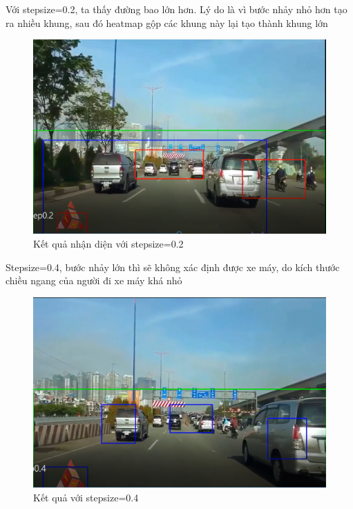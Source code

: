 \documentclass[10pt,conference,a4paper]{IEEEtran}
\begin{document}
Với stepsize=0.2, ta thấy đường bao lớn hơn. Lý do là vì bước nhảy nhỏ hơn tạo ra nhiều khung, sau đó heatmap gộp các khung này lại tạo thành khung lớn
\begin{figure}[h]
	\centering
	\includegraphics[width=1\linewidth, height=0.2\textheight]{ketqua3}
	\caption{Kết quả nhận diện với stepsize=0.2}
	\label{fig:ketqua3}
\end{figure}

Stepsize=0.4, bước nhảy lớn thì sẽ không xác định được xe máy, do kích thước chiều ngang của người đi xe máy khá nhỏ

\begin{figure}[h]
	\centering
	\includegraphics[width=1\linewidth, height=0.2\textheight]{ketqua4}
	\caption{Kết quả với stepsize=0.4}
	\label{fig:ketqua4}
\end{figure}


\pagebreak
\end{document}
